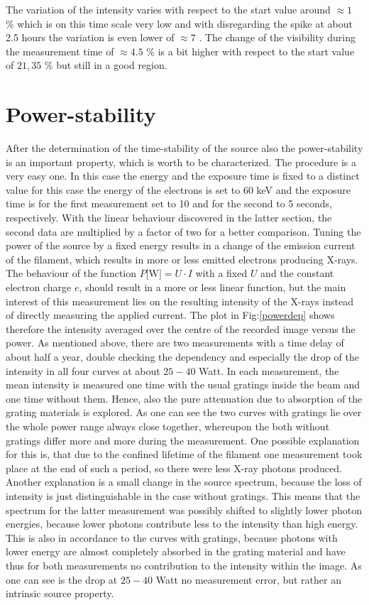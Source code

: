 The variation of the intensity varies with respect to the start value around $\approx 1$ \% which is on this time scale very low and with disregarding the spike at about 2.5 hours the variation is even lower of $\approx 7$ \permil. The change of the visibility during the measurement time of $\approx 4.5$ \% is a bit higher with respect to the start value of $21,35$ \% but still in a good region. 
\section{Power-stability}\label{sec:power}
After the determination of the time-stability of the source also the power-stability is an important property, which is worth to be characterized. The procedure is a very easy one. In this case the energy and the exposure time is fixed to a distinct value for this case the energy of the electrons is set to 60 keV and the exposure time is for the first measurement set to 10 and for the second to 5 seconds, respectively. With the linear behaviour discovered in the latter section, the second data are multiplied by a factor of two for a better comparison. Tuning the power of the source by a fixed energy results in a change of the emission current of the filament, which results in more or less emitted electrons producing X-rays. The behaviour of the function  $P \text{[W]} =U \cdot I$  with a fixed $U$ and the constant electron charge $e$, should result in a more or less linear function, but the main interest of this measurement lies on the resulting intensity of the X-rays instead of directly measuring the applied current. The plot in Fig:\ref{powerdep} shows therefore the intensity averaged over the centre of the recorded image versus the power. As mentioned above, there are two measurements with a time delay of about half a year, double checking the dependency and especially the drop of the intensity in all four curves at about $25-40$ Watt. In each measurement, the mean intensity is measured one time with the usual gratings inside the beam and one time without them. Hence, also the pure attenuation due to absorption of the grating materials is explored. As one can see the two curves with gratings lie over the whole power range always close together, whereupon the both without gratings differ more and more during the measurement. One possible explanation for this is, that due to the confined lifetime of the filament one measurement took place at the end of such a period, so there were less X-ray photons produced. Another explanation is a small change in the source spectrum, because the loss of intensity is just distinguishable in the case without gratings. This means that the spectrum for the latter measurement was possibly shifted to slightly lower photon energies, because lower photons contribute less to the intensity than high energy. This is also in accordance to the curves with gratings, because photons with lower energy are almost completely absorbed in the grating material and have thus for both measurements no contribution to the intensity within the image. As one can see is the drop at $25-40$ Watt no measurement error, but rather an intrinsic source property. 
